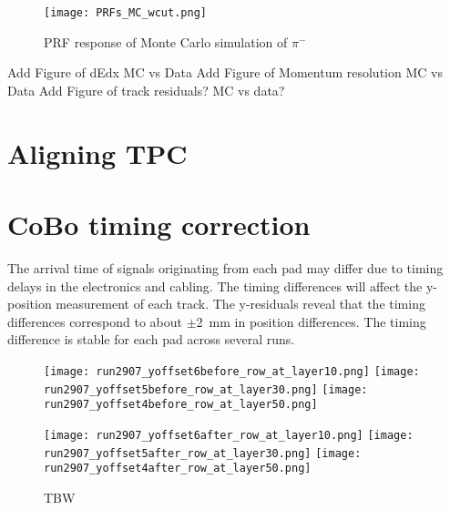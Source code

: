 \begin{figure}[!htb]
         \centering
         \texttt{[image: PRFs\_MC\_wcut.png]}
         \caption{PRF response of Monte Carlo simulation of $\pi^-$}
         \label{fig:prfpimMC}
\end{figure}


Add Figure of dEdx MC vs Data
Add Figure of Momentum resolution MC vs Data
Add Figure of track residuals? MC vs data?


\section{Aligning TPC}




\section{CoBo timing correction}
The arrival time of signals originating from each pad may differ due to timing delays in the electronics and cabling. The timing differences will affect the y-position measurement of each track. The y-residuals reveal that the timing differences correspond to about $\pm$\SI{2}{\milli\metre} in position differences. The timing difference is stable for each pad across several runs.

\begin{figure}[!htb]
  \begin{center}
    \texttt{[image: run2907\_yoffset6before\_row\_at\_layer10.png]}
    \texttt{[image: run2907\_yoffset5before\_row\_at\_layer30.png]}
    \texttt{[image: run2907\_yoffset4before\_row\_at\_layer50.png]}
 
    \texttt{[image: run2907\_yoffset6after\_row\_at\_layer10.png]}
    \texttt{[image: run2907\_yoffset5after\_row\_at\_layer30.png]}
    \texttt{[image: run2907\_yoffset4after\_row\_at\_layer50.png]}
 
    \caption{TBW\label{TBD}}
  \end{center}
  \label{fig:coboCorr}
\end{figure}



